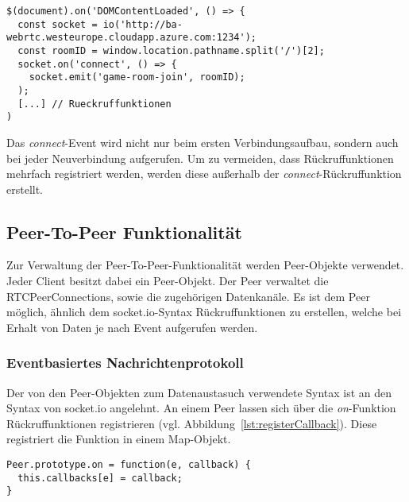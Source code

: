 \lstset{language=js, style=STYLE_CODE_JS}
\begin{minipage}{\textwidth}
\begin{singlespace}
\begin{lstlisting}[caption={Clientseitiger Verbindungsaufbau -- game.js}, captionpos=b, label={lst:socketioclient}]
$(document).on('DOMContentLoaded', () => {
  const socket = io('http://ba-webrtc.westeurope.cloudapp.azure.com:1234');
  const roomID = window.location.pathname.split('/')[2];
  socket.on('connect', () => {
    socket.emit('game-room-join', roomID);
  );
  [...] // Rueckruffunktionen
)
\end{lstlisting}
\end{singlespace}
\end{minipage}

Das \textit{connect}-Event wird nicht nur beim ersten Verbindungsaufbau, sondern auch bei jeder Neuverbindung aufgerufen. Um zu vermeiden, dass Rückruffunktionen mehrfach registriert werden, werden diese außerhalb der \textit{connect}-Rückruffunktion erstellt. 

\subsection{Peer-To-Peer Funktionalität}
Zur Verwaltung der Peer-To-Peer-Funktionalität werden \glqq{}Peer\grqq{}-Objekte verwendet. Jeder Client besitzt dabei ein Peer-Objekt. Der Peer verwaltet die RTCPeerConnections, sowie die zugehörigen Datenkanäle. Es ist dem Peer möglich, ähnlich dem socket.io-Syntax Rückruffunktionen zu erstellen, welche bei Erhalt von Daten je nach Event aufgerufen werden.\par

\subsubsection{Eventbasiertes Nachrichtenprotokoll}
\label{nachrichtenprotokoll}
Der von den Peer-Objekten zum Datenaustasuch verwendete Syntax ist an den Syntax von socket.io angelehnt. An einem Peer lassen sich über die \textit{on}-Funktion Rückruffunktionen registrieren (vgl. Abbildung~\ref{lst:registerCallback}). Diese registriert die Funktion in einem Map-Objekt.\par

\lstset{language=js, style=STYLE_CODE_JS}
\begin{singlespace}
\begin{lstlisting}[caption={Funktion zur Registrierung von Rückruffunktionen -- Peer.js}, captionpos=b, label={lst:registerCallback}]
Peer.prototype.on = function(e, callback) {
  this.callbacks[e] = callback;
}
\end{lstlisting}
\end{singlespace}

